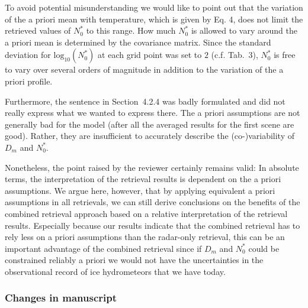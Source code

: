 \documentclass[11pt]{scrartcl}
\begin{document}
To avoid potential misunderstanding we would like to point out that the
variation of the a priori mean with temperature, which is given by Eq. 4, does
not limit the retrieved values of $N_0^*$ to this range. How much $N_0^*$ is
allowed to vary around the a priori mean is determined by the covariance matrix.
Since the standard deviation for $\text{log}_{10}(N_0^*)$ at each grid point was
set to $2$ (c.f. Tab.~3), $N_0^*$ is free to vary over several orders of
magnitude in addition to the variation of the a priori profile.

Furthermore, the sentence in Section~4.2.4 was badly formulated and did not
really express what we wanted to express there. The a priori assumptions are not
generally bad for the model (after all the averaged results for the first scene
are good). Rather, they are insufficient to accurately describe the
(co-)variability of $D_m$ and $N_0^*$.

Nonetheless, the point raised by the reviewer certainly remains valid: In
absolute terms, the interpretation of the retrieval results is dependent on the
a priori assumptions. We argue here, however, that by applying equivalent a
priori assumptions in all retrievals, we can still derive conclusions on the
benefits of the combined retrieval approach based on a relative interpretation
of the retrieval results. Especially because our results indicate that the
combined retrieval has to rely less on a priori assumptions than the radar-only
retrieval, this can be an important advantage of the combined retrieval since
if $D_m$ and $N_0^*$ could be constrained reliably a priori we would not have
the uncertainties in the observational record of ice hydrometeors that we have
today.

\subsubsection*{Changes in manuscript}
\end{document}
